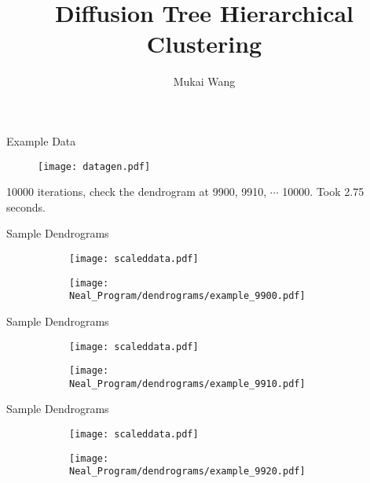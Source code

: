 \documentclass{beamer}
\title[Bayesian Hierarchical Clustering]{Diffusion Tree Hierarchical Clustering}
\author{Mukai Wang}
\begin{document}
	\begin{frame}
		\titlepage
	\end{frame}
	
	\begin{frame}{Example Data}
		\begin{figure}[htbp]
			\centering
			\texttt{[image: datagen.pdf]}
		\end{figure}
		10000 iterations, check the dendrogram at 9900, 9910, $\cdots$ 10000. Took 2.75 seconds.
	\end{frame}

	\begin{frame}{Sample Dendrograms}
		\begin{figure}[htbp]
			\begin{subfigure}[b]{0.45\columnwidth}
				\centering
				\texttt{[image: scaleddata.pdf]}
			\end{subfigure}
			\hfill
			\begin{subfigure}[b]{0.45\columnwidth}
				\centering
				\texttt{[image: Neal\_Program/dendrograms/example\_9900.pdf]}
			\end{subfigure}
		\end{figure}
	\end{frame}

	
	\begin{frame}{Sample Dendrograms}
		\begin{figure}[htbp]
			\begin{subfigure}[b]{0.45\columnwidth}
				\centering
				\texttt{[image: scaleddata.pdf]}
			\end{subfigure}
			\hfill
			\begin{subfigure}[b]{0.45\columnwidth}
				\centering
				\texttt{[image: Neal\_Program/dendrograms/example\_9910.pdf]}
			\end{subfigure}
		\end{figure}
	\end{frame}

	\begin{frame}{Sample Dendrograms}
		\begin{figure}[htbp]
			\begin{subfigure}[b]{0.45\columnwidth}
				\centering
				\texttt{[image: scaleddata.pdf]}
			\end{subfigure}
			\hfill
			\begin{subfigure}[b]{0.45\columnwidth}
				\centering
				\texttt{[image: Neal\_Program/dendrograms/example\_9920.pdf]}
			\end{subfigure}
		\end{figure}
	\end{frame}
\end{document}
